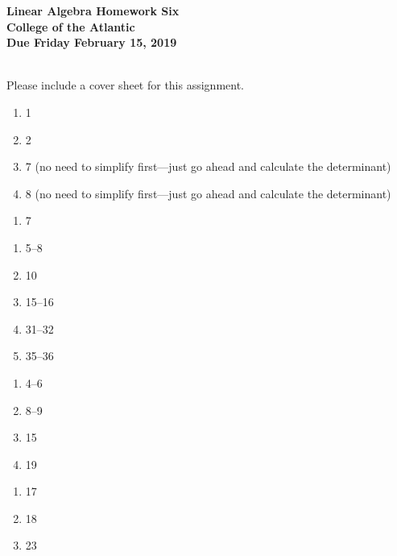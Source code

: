 \documentclass[11pt]{article}
\begin{document}
\pagestyle{empty}
 
\begin{center}
{\Large {\bf Linear Algebra Homework Six}}\\
\medskip
{\large {\bf College of the Atlantic}}\\
\medskip
{\large {\bf Due Friday February 15, 2019}}\\
\medskip
\end{center}

\\


\noindent Please include a cover sheet for this assignment.\\

\begin{enumerate}
\setlength{\itemsep}{-1mm}
\item 1
\item 2
\item 7 (no need to simplify first---just go ahead and calculate the
  determinant)
\item 8 (no need to simplify first---just go ahead and calculate the 
  determinant)
\end{enumerate}


\begin{enumerate}
\setlength{\itemsep}{-1mm}
\item 7
\end{enumerate}


\begin{enumerate}
\setlength{\itemsep}{-1mm}
\item 5--8
\item 10
\item 15--16
\item 31--32
\item 35--36
  
\end{enumerate}


\begin{enumerate}
\setlength{\itemsep}{-1mm}
\item 4--6
\item 8--9
\item 15
\item 19
\end{enumerate}


\begin{enumerate}
\setlength{\itemsep}{-1mm}
\item 17
\item 18
\item 23
\end{enumerate}
\end{document}
